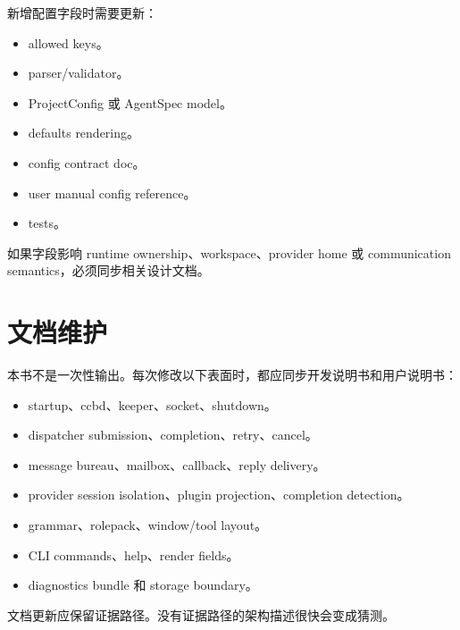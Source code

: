 新增配置字段时需要更新：

\begin{itemize}
  \item allowed keys。
  \item parser/validator。
  \item ProjectConfig 或 AgentSpec model。
  \item defaults rendering。
  \item config contract doc。
  \item user manual config reference。
  \item tests。
\end{itemize}

如果字段影响 runtime ownership、workspace、provider home 或 communication semantics，必须同步相关设计文档。

\section{文档维护}

本书不是一次性输出。每次修改以下表面时，都应同步开发说明书和用户说明书：

\begin{itemize}
  \item startup、ccbd、keeper、socket、shutdown。
  \item dispatcher submission、completion、retry、cancel。
  \item message bureau、mailbox、callback、reply delivery。
  \item provider session isolation、plugin projection、completion detection。
  \item {} grammar、rolepack、window/tool layout。
  \item CLI commands、help、render fields。
  \item diagnostics bundle 和 storage boundary。
\end{itemize}

文档更新应保留证据路径。没有证据路径的架构描述很快会变成猜测。
